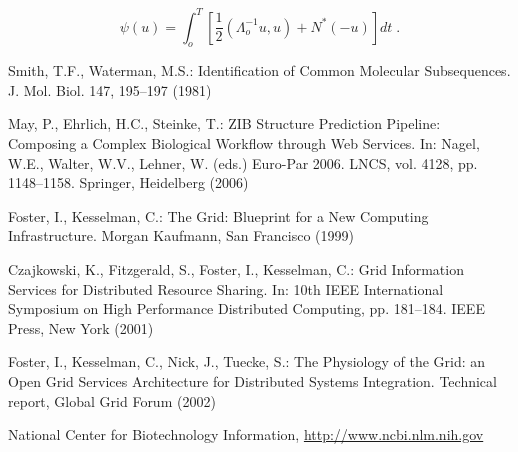 \documentclass[runningheads,a4paper]{llncs}
\begin{document}
\begin{equation}
  \psi (u) = \int_{o}^{T} \left[\frac{1}{2}
  \left(\Lambda_{o}^{-1} u,u\right) + N^{\ast} (-u)\right] dt \;  .
\end{equation}



\begin{thebibliography}{4}

 Smith, T.F., Waterman, M.S.: Identification of Common Molecular
Subsequences. J. Mol. Biol. 147, 195--197 (1981)

 May, P., Ehrlich, H.C., Steinke, T.: ZIB Structure Prediction Pipeline:
Composing a Complex Biological Workflow through Web Services. In: Nagel,
W.E., Walter, W.V., Lehner, W. (eds.) Euro-Par 2006. LNCS, vol. 4128,
pp. 1148--1158. Springer, Heidelberg (2006)

 Foster, I., Kesselman, C.: The Grid: Blueprint for a New Computing
Infrastructure. Morgan Kaufmann, San Francisco (1999)

 Czajkowski, K., Fitzgerald, S., Foster, I., Kesselman, C.: Grid
Information Services for Distributed Resource Sharing. In: 10th IEEE
International Symposium on High Performance Distributed Computing, pp.
181--184. IEEE Press, New York (2001)

 Foster, I., Kesselman, C., Nick, J., Tuecke, S.: The Physiology of the
Grid: an Open Grid Services Architecture for Distributed Systems
Integration. Technical report, Global Grid Forum (2002)

 National Center for Biotechnology Information, \url{http://www.ncbi.nlm.nih.gov}

\end{thebibliography}
\end{document}
